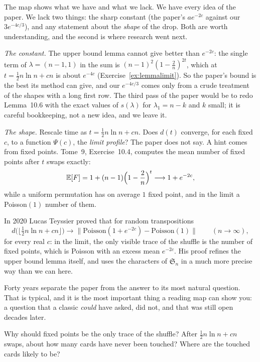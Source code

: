The map shows what we have and what we lack. We have every idea of the paper. We lack two things: the sharp constant (the paper's $ae^{-2c}$
against our $3e^{-4c/3}$), and any statement about the \emph{shape} of the drop. Both are worth understanding, and the second is where research went
next.

\emph{The constant.} The upper bound lemma cannot give better than $e^{-2c}$: the single term of $\lambda=(n-1,1)$ in the sum is
$(n-1)^2(1-\frac2n)^{2t}$, which at $t=\frac12n\ln n+cn$ is about $e^{-4c}$ (Exercise~\ref{ex:lemmalimit}). So the paper's bound is the best its method can give,
and our $e^{-4c/3}$ comes only from a crude treatment of the shapes with a long first row. The third pass of the paper would be to redo
Lemma~10.6 with the exact values of $s(\lambda)$ for $\lambda_1=n-k$ and $k$ small; it is careful bookkeeping, not a new idea, and we leave it.

\emph{The shape.} Rescale time as $t=\frac12n\ln n+cn$. Does $d(t)$ converge, for each fixed $c$, to a function $\Psi(c)$, the \emph{limit profile}? The
paper does not say. A hint comes from fixed points. Tome~9, Exercise~10.4, computes the mean number of fixed points after $t$ swaps exactly:
\[
\mathbb E[F]=1+(n-1)\Bigl(1-\frac2n\Bigr)^t\longrightarrow1+e^{-2c},
\]
while a uniform permutation has on average $1$ fixed point, and in the limit a Poisson$(1)$ number of them.

\begin{remark}\label{rem:teyssier}
In 2020 Lucas Teyssier proved that for random transpositions
\[
d\bigl(\lfloor\tfrac12n\ln n+cn\rfloor\bigr)\longrightarrow\bigl\|\mathrm{Poisson}(1+e^{-2c})-\mathrm{Poisson}(1)\bigr\|\qquad(n\to\infty),
\]
for every real $c$: in the limit, the only visible trace of the shuffle is the number of fixed points, which is Poisson with an excess mean $e^{-2c}$. His proof
refines the upper bound lemma itself, and uses the characters of $\mathfrak S_n$ in a much more precise way than we can here.
\end{remark}

Forty years separate the paper from the answer to its most natural question. That is typical, and it is the most important thing a reading map
can show you: a question that a classic \emph{could} have asked, did not, and that was still open decades later.

\begin{think}
Why should fixed points be the only trace of the shuffle? After $\frac12n\ln n+cn$ swaps, about how many cards have never been touched? Where are
the touched cards likely to be?
\end{think}

